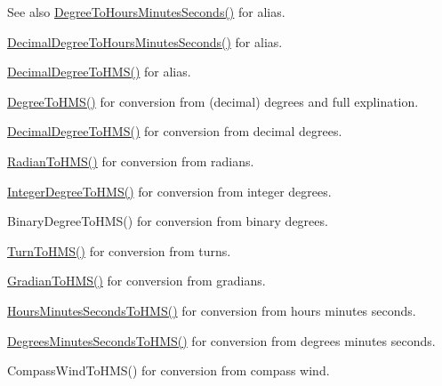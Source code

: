 \begin{DoxySeeAlso}{See also}
\mbox{\hyperlink{group___e_g_x_math-_conversions-_angle_conversions-_degree_ga770b13da33b6f6c7bfa398cca7f24dbe}{Degree\+To\+Hours\+Minutes\+Seconds()}} for alias. 

\mbox{\hyperlink{group___e_g_x_math-_conversions-_angle_conversions-_decimal_degree_gaa3f0b6c7c497882935487ad2d55a0f5a}{Decimal\+Degree\+To\+Hours\+Minutes\+Seconds()}} for alias. 

\mbox{\hyperlink{group___e_g_x_math-_conversions-_angle_conversions-_decimal_degree_ga981b48f16766590641360ca98dfa7b8c}{Decimal\+Degree\+To\+H\+M\+S()}} for alias. 

\mbox{\hyperlink{group___e_g_x_math-_conversions-_angle_conversions-_degree_ga0bb223ca6e77b00439a6d910ab32d82e}{Degree\+To\+H\+M\+S()}} for conversion from (decimal) degrees and full explination. 

\mbox{\hyperlink{group___e_g_x_math-_conversions-_angle_conversions-_decimal_degree_ga981b48f16766590641360ca98dfa7b8c}{Decimal\+Degree\+To\+H\+M\+S()}} for conversion from decimal degrees. 

\mbox{\hyperlink{group___e_g_x_math-_conversions-_angle_conversions-_radian_ga55b5fba9307f34ab8db57391789a90cc}{Radian\+To\+H\+M\+S()}} for conversion from radians. 

\mbox{\hyperlink{group___e_g_x_math-_conversions-_angle_conversions-_integer_degree_gae6b79bd5a92f8c6942b9fc2c50695e6a}{Integer\+Degree\+To\+H\+M\+S()}} for conversion from integer degrees. 

Binary\+Degree\+To\+H\+M\+S() for conversion from binary degrees. 

\mbox{\hyperlink{group___e_g_x_math-_conversions-_angle_conversions-_turn_ga74efaece2f95aa6671f18382e5f3925f}{Turn\+To\+H\+M\+S()}} for conversion from turns. 

\mbox{\hyperlink{group___e_g_x_math-_conversions-_angle_conversions-_gradian_ga6513a992679fbb97d2969cf8bd68306f}{Gradian\+To\+H\+M\+S()}} for conversion from gradians. 

\mbox{\hyperlink{group___e_g_x_math-_conversions-_angle_conversions-_hours_minutes_seconds_ga5ac65e4e7ed8857151b3f81f5928df3a}{Hours\+Minutes\+Seconds\+To\+H\+M\+S()}} for conversion from hours minutes seconds. 

\mbox{\hyperlink{group___e_g_x_math-_conversions-_angle_conversions-_degrees_minutes_seconds_ga63c1cd3c9048d0c5a80fd9bc851c38ac}{Degrees\+Minutes\+Seconds\+To\+H\+M\+S()}} for conversion from degrees minutes seconds. 

Compass\+Wind\+To\+H\+M\+S() for conversion from compass wind. 
\end{DoxySeeAlso}
\mbox{\label{group___e_g_x_math-_conversions-_angle_conversions-_degree_ga770b13da33b6f6c7bfa398cca7f24dbe}} 
